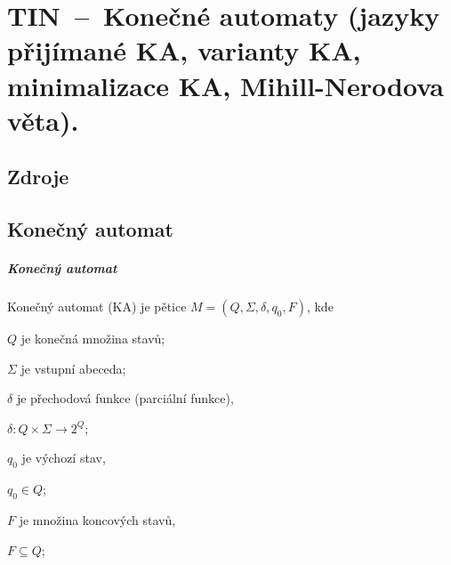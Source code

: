 

\graphicspath{{tin/konecne_automaty/figures}}


\chapter{TIN~--~Konečné automaty (jazyky přijímané KA, varianty KA, minimalizace KA, Mihill-Nerodova věta).}


\section{Zdroje}

\begin{compactitem}
    \item {}
    \item {}
    \item {}
\end{compactitem}


\section{Konečný automat}

\paragraph*{Konečný automat} Konečný automat (KA) je pětice $M = (Q, \Sigma, \delta, q_0, F)$, kde \begin{compactitem}
    \item $Q$ je konečná množina stavů;
    \item $\Sigma$ je vstupní abeceda;
    \item $\delta$ je přechodová funkce (parciální funkce), \begin{compactitem}
        \item $\delta : Q \times \Sigma \rightarrow 2^{Q}$;
    \end{compactitem}
    \item $q_0$ je výchozí stav, \begin{compactitem}
        \item $q_0 \in Q$;
    \end{compactitem}
    \item $F$ je množina koncových stavů, \begin{compactitem}
        \item $F \subseteq Q$;
    \end{compactitem}
\end{compactitem}

